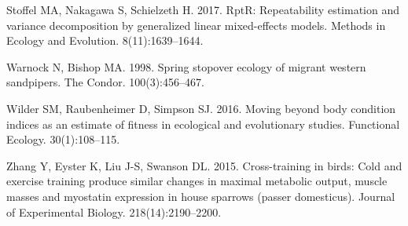 \documentclass[
]{article}
\begin{document}
\leavevmode\hypertarget{ref-stoffel2017rptr}{}%
Stoffel MA, Nakagawa S, Schielzeth H. 2017. RptR: Repeatability
estimation and variance decomposition by generalized linear
mixed-effects models. Methods in Ecology and Evolution.
8(11):1639--1644.

\leavevmode\hypertarget{ref-warnock1998spring}{}%
Warnock N, Bishop MA. 1998. Spring stopover ecology of migrant western
sandpipers. The Condor. 100(3):456--467.

\leavevmode\hypertarget{ref-wilder2016moving}{}%
Wilder SM, Raubenheimer D, Simpson SJ. 2016. Moving beyond body
condition indices as an estimate of fitness in ecological and
evolutionary studies. Functional Ecology. 30(1):108--115.

\leavevmode\hypertarget{ref-zhang2015cross}{}%
Zhang Y, Eyster K, Liu J-S, Swanson DL. 2015. Cross-training in birds:
Cold and exercise training produce similar changes in maximal metabolic
output, muscle masses and myostatin expression in house sparrows (passer
domesticus). Journal of Experimental Biology. 218(14):2190--2200.
\end{document}
